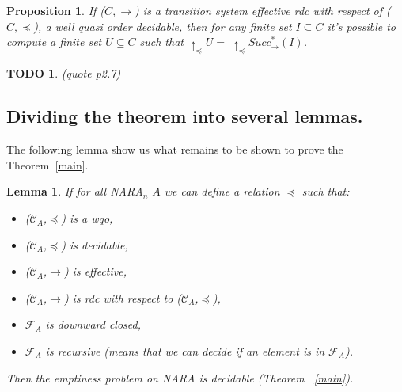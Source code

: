 \documentclass[a4paper,10pt]{report}
\newtheorem{lm}{Lemma}
\newtheorem{pp}{Proposition}
\newtheorem{td}{TODO}
\theoremstyle{remark}
\newcommand{\C}{\mathcal{C}_{A}}
\newcommand{\F}{\mathcal{F}_{A}}
\begin{document}
\begin{pp} 
  \label{pp}
  If  ($C,\rightarrow$) is a transition system effective rdc with respect of ($C,\preceq$), a well quasi order decidable, then for any finite set $I\subseteq C$ it's possible to compute a finite set $U \subseteq C$ such that
  $\uparrow_\preceq U=\ \uparrow_\preceq Succ^*_\rightarrow (I)$.
\end{pp}

\begin{td}
  (quote p2.7)
\end{td}

\subsection{Dividing the theorem into several lemmas.}

The following lemma show us what remains to be shown to prove the Theorem~\ref{main}.
\begin{lm}
    \label{mlm}
    If for all \textit{NARA}$_n$ $A$ we can define a relation $\preceq$ such that: 
     \begin{itemize}
	\item ($\C$,$\preceq$) is a wqo,
	\item ($\C$,$\preceq$) is decidable,
	\item ($\C$,$\rightarrow$) is effective,
	\item ($\C$,$\rightarrow$) is rdc with respect to ($\C$,$\preceq$),
	\item $\F$ is downward closed,
	\item $\F$ is recursive (means that we can decide if an element is in $\F$).
     \end{itemize}
      Then the emptiness problem on \textit{NARA} is decidable (Theorem ~\ref{main}).
\end{lm}
\end{document}
